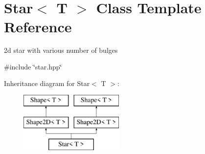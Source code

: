 \hypertarget{classStar}{}\section{Star$<$ T $>$ Class Template Reference}
\label{classStar}


2d star with various number of bulges  




{\ttfamily \#include \char`\"{}star.\+hpp\char`\"{}}

Inheritance diagram for Star$<$ T $>$\+:\begin{figure}[H]
\begin{center}
\leavevmode
\includegraphics[height=3.000000cm]{classStar}
\end{center}
\end{figure}
